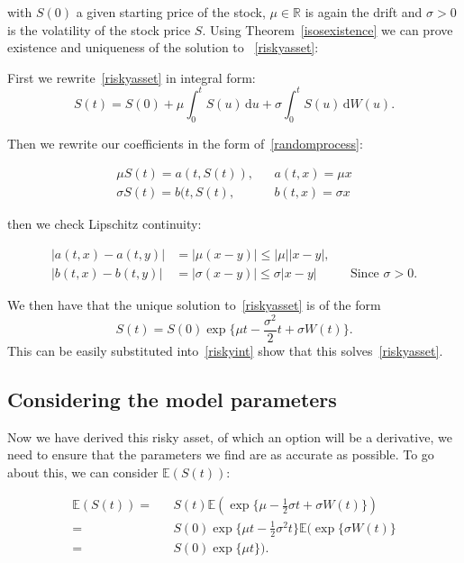 \documentclass[11pt]{article} %
\begin{document}
with $S(0)$ a given starting price of the stock, $\mu \in \mathbb{R}$ 
is again the drift and $\sigma > 0$ is the volatility of the stock 
price $S$. Using Theorem~\eqref{isosexistence} we can prove existence and uniqueness of 
the solution to  
~\eqref{riskyasset}:

First we rewrite~\eqref{riskyasset} in integral form:
\begin{equation}\label{riskyint}
    S(t) = S(0) + \mu\int_0^t \! S(u) \, \mathrm{d}u + \sigma\int_0^t \! S(u) \, 
    \mathrm{d}W(u).
\end{equation}

Then we rewrite our coefficients in the form of~\eqref{randomprocess}: 

\begin{align}
    \mu S(t) = a(t,S(t)), && a(t,x) = \mu x \\
    \sigma S(t) = b(t,S(t), && b(t,x) = \sigma x
\end{align}

then we check Lipschitz continuity:

\begin{align}
    |a(t,x) - a(t,y)| &= |\mu(x-y)| \leq |\mu||x-y|, \\
    |b(t,x) - b(t,y)| &= |\sigma(x-y)| \leq \sigma|x-y| &&\text{Since $\sigma > 0$.}
\end{align}

We then have that the unique solution to~\eqref{riskyasset} is of the form 
\begin{equation}\label{riskysolution}
    S(t) = S(0)\exp\{\mu t - \frac{\sigma^2}{2}t + \sigma W(t)\}.
\end{equation}
This can be easily substituted into~\eqref{riskyint} show that this solves~\eqref{riskyasset}.

\subsection{Considering the model parameters}

Now we have derived this risky asset, of which an option will be a derivative, 
we need to ensure that the parameters we find are as accurate as possible. To 
go about this, we can consider $\mathbb{E}(S(t))$:

\begin{align}
    \mathbb{E}(S(t))  = &&S(t)\mathbb{E}(\exp\{\mu - \frac{1}{2}\sigma t + \sigma W(t)\})\\
     \label{variance}= 
     && S(0)\exp\{\mu t - \frac{1}{2}\sigma^2 t\}\mathbb{E}(\exp\{\sigma W(t)\} \\
    \label{result} = && S(0)\exp\{\mu t\}).
\end{align}
\end{document}
